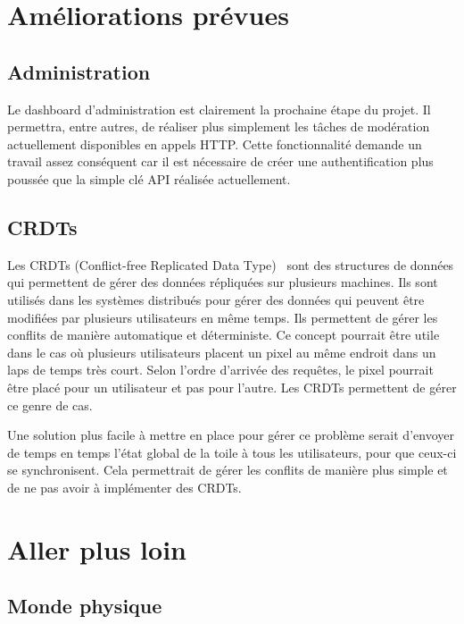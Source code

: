 
\section{Améliorations prévues}

\subsection{Administration}

Le dashboard d'administration est clairement la prochaine étape du projet. Il permettra, entre autres, de réaliser plus simplement les tâches de modération actuellement disponibles en appels HTTP. Cette fonctionnalité demande un travail assez conséquent car il est nécessaire de créer une authentification plus poussée que la simple clé API réalisée actuellement.

\subsection{CRDTs}

Les CRDTs (Conflict-free Replicated Data Type)~\cite{crdt} sont des structures de données qui permettent de gérer des données répliquées sur plusieurs machines. Ils sont utilisés dans les systèmes distribués pour gérer des données qui peuvent être modifiées par plusieurs utilisateurs en même temps. Ils permettent de gérer les conflits de manière automatique et déterministe. Ce concept pourrait être utile dans le cas où plusieurs utilisateurs placent un pixel au même endroit dans un laps de temps très court. Selon l'ordre d'arrivée des requêtes, le pixel pourrait être placé pour un utilisateur et pas pour l'autre. Les CRDTs permettent de gérer ce genre de cas.

Une solution plus facile à mettre en place pour gérer ce problème serait d'envoyer de temps en temps l'état global de la toile à tous les utilisateurs, pour que ceux-ci se synchronisent. Cela permettrait de gérer les conflits de manière plus simple et de ne pas avoir à implémenter des CRDTs.

\section{Aller plus loin}

\subsection{Monde physique}

